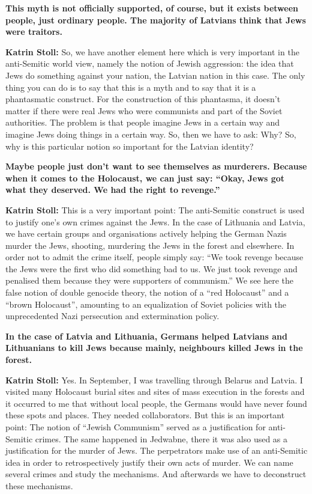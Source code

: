 \textbf{This myth is not officially supported, of course, but it exists between people, just ordinary people. The majority of Latvians think that Jews were traitors.} 

\textbf{Katrin Stoll:} So, we have another element here which is very important in the anti-Semitic world view, namely the notion of Jewish aggression: the idea that Jews do something against your nation, the Latvian nation in this case. The only thing you can do is to say that this is a myth and to say that it is a phantasmatic construct. For the construction of this phantasma, it doesn’t matter if there were real Jews who were communists and part of the Soviet authorities. The problem is that people imagine Jews in a certain way and imagine Jews doing things in a certain way. So, then we have to ask: Why? So, why is this particular notion so important for the Latvian identity? 

\textbf{Maybe people just don’t want to see themselves as murderers. Because when it comes to the Holocaust, we can just say: ``Okay, Jews got what they deserved. We had the right to revenge.''} 

\textbf{Katrin Stoll:} This is a very important point: The anti-Semitic construct is used to justify one’s own crimes against the Jews. In the case of Lithuania and Latvia, we have certain groups and organisations actively helping the German Nazis murder the Jews, shooting, murdering the Jews in the forest and elsewhere. In order not to admit the crime itself, people simply say: ``We took revenge because the Jews were the first who did something bad to us. We just took revenge and penalised them because they were supporters of communism.'' We see here the false notion of double genocide theory, the notion of a ``red Holocaust'' and a ``brown Holocaust'', amounting to an equalization of Soviet policies with the unprecedented Nazi persecution and extermination policy.  

\textbf{In the case of Latvia and Lithuania, Germans helped Latvians and Lithuanians to kill Jews because mainly, neighbours killed Jews in the forest.}

\textbf{Katrin Stoll:} Yes. In September, I was travelling through Belarus and Latvia. I visited many Holocaust burial sites and sites of mass execution in the forests and it occurred to me that without local people, the Germans would have never found these spots and places. They needed collaborators.  But this is an important point: The notion of ``Jewish Communism'' served as a justification for anti-Semitic crimes. The same happened in Jedwabne, there it was also used as a justification for the murder of Jews. The perpetrators make use of an anti-Semitic idea in order to retrospectively justify their own acts of murder. We can name several crimes and study the mechanisms. And afterwards we have to deconstruct these mechanisms. 

